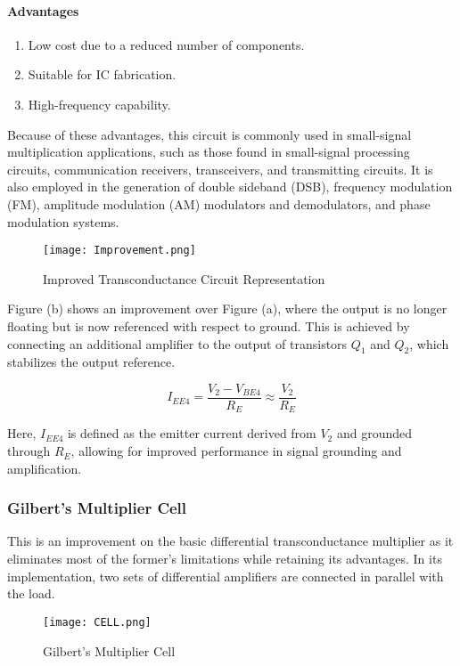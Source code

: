 \documentclass[a4paper,9pt,twoside,openany,twocolumn]{memoir}
\begin{document}
\paragraph{Advantages}
\begin{enumerate}
    \item Low cost due to a reduced number of components.
    \item Suitable for IC fabrication.
    \item High-frequency capability.
\end{enumerate}

Because of these advantages, this circuit is commonly used in small-signal multiplication applications, such as those found in small-signal processing circuits, communication receivers, transceivers, and transmitting circuits. It is also employed in the generation of double sideband (DSB), frequency modulation (FM), amplitude modulation (AM) modulators and demodulators, and phase modulation systems.

\begin{figure}[h]
    \centering
    \texttt{[image: Improvement.png]} %
    \caption{Improved Transconductance Circuit Representation}
    \label{fig:improved_transconductance}
\end{figure}

Figure (b) shows an improvement over Figure (a), where the output is no longer floating but is now referenced with respect to ground. This is achieved by connecting an additional amplifier to the output of transistors \( Q_1 \) and \( Q_2 \), which stabilizes the output reference.

\[
I_{EE4} = \frac{V_2 - V_{BE4}}{R_E} \approx \frac{V_2}{R_E}
\]

Here, \( I_{EE4} \) is defined as the emitter current derived from \( V_2 \) and grounded through \( R_E \), allowing for improved performance in signal grounding and amplification.

\subsubsection{Gilbert's Multiplier Cell}
This is an improvement on the basic differential transconductance multiplier as it eliminates most of the former's limitations while retaining its advantages. In its implementation, two sets of differential amplifiers are connected in parallel with the load.
\begin{figure}[h]
    \centering
    \texttt{[image: CELL.png]} %
    \caption{Gilbert's Multiplier Cell}
    \label{fig:CELL}
\end{figure}
\end{document}
